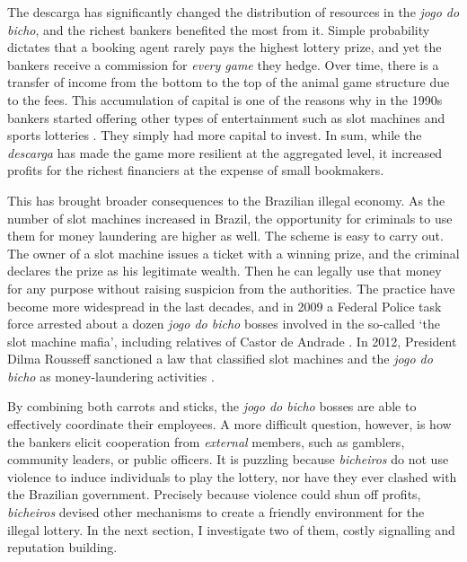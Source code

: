 \documentclass[a4paper,12pt]{article}
\begin{document}
The descarga has significantly changed the distribution of resources in the \emph{jogo do bicho}, and the richest bankers benefited the most from it. Simple probability dictates that a booking agent rarely pays the highest lottery prize, and yet the bankers receive a commission for \emph{every game} they hedge. Over time, there is a transfer of income from the bottom to the top of the animal game structure due to the fees. This accumulation of capital is one of the reasons why in the 1990s bankers started offering other types of entertainment such as slot machines and sports lotteries \citep{estado2006cacaniquel,globo2015cacaniquel,terra2011cacaniquel}. They simply had more capital to invest. In sum, while the \textit{descarga} has made the game more resilient at the aggregated level, it increased profits for the richest financiers at the expense of small bookmakers.

This has brought broader consequences to the Brazilian illegal economy. As the number of slot machines increased in Brazil, the opportunity for criminals to use them for money laundering are higher as well. The scheme is easy to carry out. The owner of a slot machine issues a ticket with a winning prize, and the criminal declares the prize as his legitimate wealth. Then he can legally use that money for any purpose without raising suspicion from the authorities. The practice have become more widespread in the last decades, and in 2009 a Federal Police task force arrested about a dozen \textit{jogo do bicho} bosses involved in the so-called `the slot machine mafia', including relatives of Castor de Andrade \citep{estado2011cacaniquel}. In 2012, President Dilma Rousseff sanctioned a law that classified slot machines and the \textit{jogo do bicho} as money-laundering activities \citep{agenciabrasil2012dilma}. 

By combining both carrots and sticks, the \textit{jogo do bicho} bosses are able to effectively coordinate their employees. A more difficult question, however, is how the bankers elicit cooperation from \textit{external} members, such as gamblers, community leaders, or public officers. It is puzzling because \textit{bicheiros} do not use violence to induce individuals to play the lottery, nor have they ever clashed with the Brazilian government. Precisely because violence could shun off profits, \textit{bicheiros} devised other mechanisms to create a friendly environment for the illegal lottery. In the next section, I investigate two of them, costly signalling and reputation building. 
\end{document}
